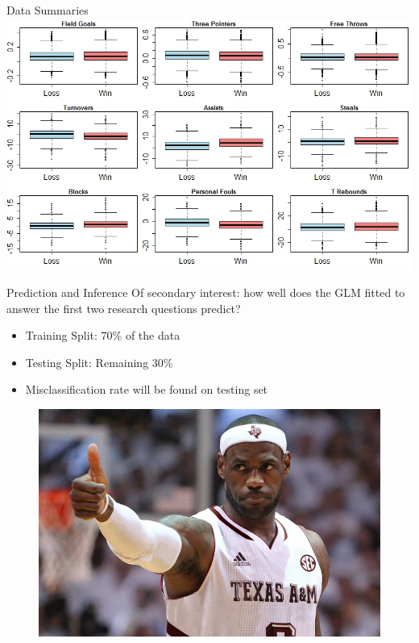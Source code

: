 \documentclass{beamer}
\begin{document}
\begin{frame}{Data Summaries}
	\centering
	\includegraphics[height=.85\textheight]{toomanyboxes.jpeg}
\end{frame}

\begin{frame}{Prediction and Inference} 
Of secondary interest: how well does the GLM fitted to answer the first two research questions predict?
\begin{itemize}
	\item Training Split: 70\% of the data
	\item Testing Split: Remaining 30\%
	\item Misclassification rate will be found on testing set
\end{itemize}
\begin{figure}[r]
	\includegraphics[height = .5\textheight]{fakelebron.png}
\end{figure}
\end{frame}
\end{document}
